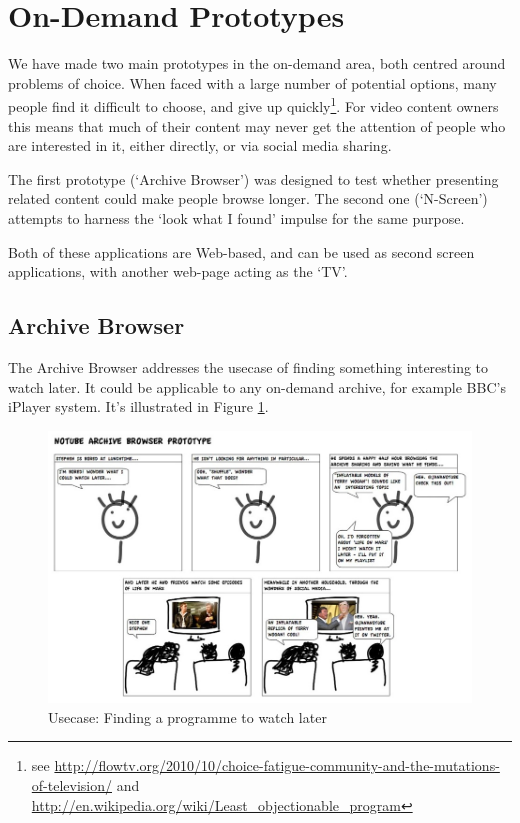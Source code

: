 \documentclass{notube}
\begin{document}
\section{On-Demand Prototypes}

We have made two main prototypes in the on-demand area, both centred around problems of choice. When faced with a large number of potential options, many people find it difficult to choose, and give up quickly\footnote{see \url{http://flowtv.org/2010/10/choice-fatigue-community-and-the-mutations-of-television/} and \url{http://en.wikipedia.org/wiki/Least_objectionable_program}}. For video content owners this means that much of their content may never get the attention of people who are interested in it, either directly, or via social media sharing.

The first prototype (`Archive Browser') was designed to test whether presenting related content could make people browse longer. The second one (`N-Screen') attempts to harness the `look what I found' impulse for the same purpose.

Both of these applications are Web-based, and can be used as second screen applications, with another web-page acting as the `TV'.

\subsection{Archive Browser}

The Archive Browser addresses the usecase of finding something interesting to watch later. It could be applicable to any on-demand archive, for example BBC's iPlayer system. It's illustrated in Figure \ref{fig:archive}.

\begin{figure}[htbp]
\begin{center}
\includegraphics[width=6in]{images/archive.jpg}
\caption{Usecase: Finding a programme to watch later} \label{fig:archive}
\end{center}
\end{figure} 
\end{document}
